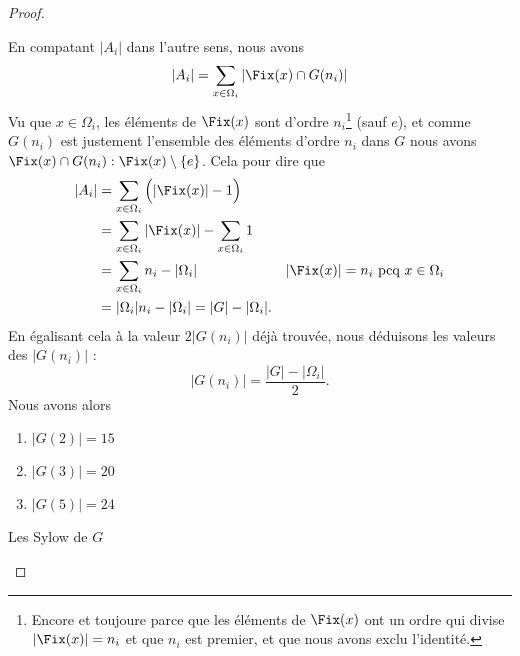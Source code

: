 \begin{proof}
\begin{subproof}
                En compatant \( | A_i |\) dans l'autre sens, nous avons
                \begin{equation}        \label{EQooBHIIooVcGgFd}
                    | A_i |=\sum_{x\in \Omega_i}|  \Fix(x)\cap G(n_i) | 
                \end{equation}
                Vu que \( x\in \Omega_i\), les éléments de \( \Fix(x)\) sont d'ordre \( n_i\)\footnote{Encore et toujoure parce que les éléments de \( \Fix(x)\) ont un ordre qui divise \( | \Fix(x) |=n_i\) et que \( n_i\) est premier, et que nous avons exclu l'identité.} (sauf \( e\)), et comme \( G(n_i)\) est justement l'ensemble des éléments d'ordre \( n_i\) dans \( G\) nous avons \( \Fix(x)\cap G(n_i):\Fix(x)\setminus\{ e \}\). Cela pour dire que
                \begin{subequations}
                    \begin{align}
                        | A_i |&=\sum_{x\in \Omega_i}\Big( |\Fix(x)|-1\Big)\\
                        &=\sum_{x\in \Omega_i}| \Fix(x) |-\sum_{x\in \Omega_i}1\\
                        &=\sum_{x\in \Omega_i}n_i-| \Omega_i |  & | \Fix(x) |=n_i \text{ pcq }x\in\Omega_i\\
                        &=| \Omega_i |n_i-| \Omega_i |=| G |-| \Omega_i |.
                    \end{align}
                \end{subequations}
                En égalisant cela à la valeur \( 2|G(n_i)|\) déjà trouvée, nous déduisons les valeurs des \( | G(n_i) |\) :
                \begin{equation}
                    | G(n_i) |=\frac{ | G |-| \Omega_i | }{2}.
                \end{equation}
                Nous avons alors
                \begin{enumerate}
                    \item
                        \( | G(2) |=15\)
                    \item
                        \( | G(3) |=20\)
                    \item
                        \( | G(5) |=24\)
                \end{enumerate}

            \item[Les Sylow de \( G\)]


\end{subproof}
\end{proof}
